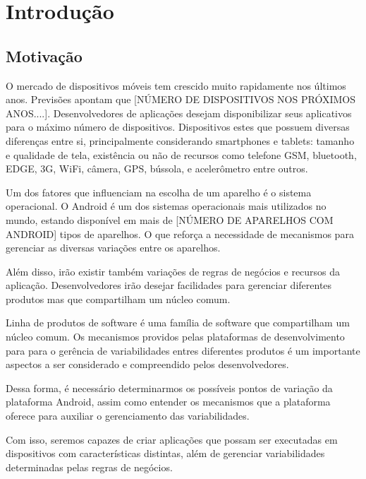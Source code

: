 \chapter{Introdução}

\section{Motivação}
O mercado de dispositivos móveis tem crescido muito rapidamente nos últimos anos.
Previsões apontam que [NÚMERO DE DISPOSITIVOS NOS PRÓXIMOS ANOS....]. Desenvolvedores
de aplicações desejam disponibilizar seus aplicativos para o máximo número de 
dispositivos. Dispositivos estes que possuem diversas diferenças entre si, 
principalmente considerando smartphones e tablets: tamanho e qualidade de tela, 
existência ou não de recursos como telefone GSM, bluetooth, EDGE, 3G, WiFi, câmera, 
GPS, bússola, e acelerômetro entre outros.

Um dos fatores que influenciam na escolha de um aparelho é o sistema operacional.
O Android é um dos sistemas operacionais mais utilizados no mundo, estando 
disponível em mais de [NÚMERO DE APARELHOS COM ANDROID] tipos de aparelhos. 
O que reforça a necessidade de mecanismos para gerenciar as diversas variações entre 
os aparelhos.

Além disso, irão existir também variações de regras de negócios e recursos da aplicação.
Desenvolvedores irão desejar facilidades para gerenciar diferentes produtos mas que 
compartilham um núcleo comum.

Linha de produtos de software é uma família de software que compartilham um núcleo 
comum. Os mecanismos providos pelas plataformas de desenvolvimento para para o gerência 
de variabilidades entres diferentes produtos é um importante aspectos a ser considerado
e compreendido pelos desenvolvedores.

Dessa forma, é necessário determinarmos os possíveis pontos 
de variação da plataforma Android, assim como entender os mecanismos que a plataforma 
oferece para auxiliar o gerenciamento das variabilidades.

Com isso, seremos capazes de criar aplicações que possam ser executadas em dispositivos
com características distintas, além de gerenciar variabilidades determinadas pelas 
regras de negócios.

